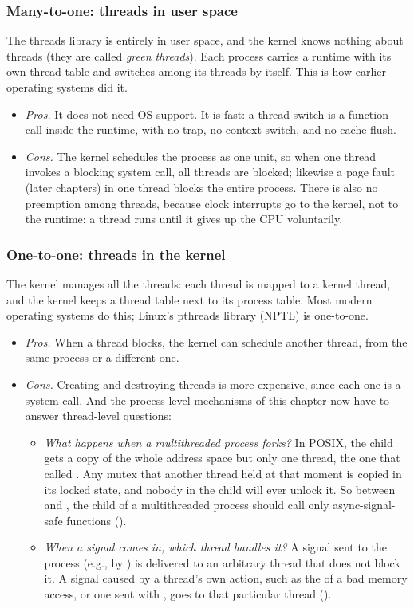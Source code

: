 \subsubsection{Many-to-one: threads in user space}
The threads library is entirely in user space, and the kernel knows nothing about threads (they are called \emph{green threads}). Each process carries a runtime with its own thread table and switches among its threads by itself. This is how earlier operating systems did it.
\begin{itemize}
  \item \emph{Pros.} It does not need OS support. It is fast: a thread switch is a function call inside the runtime, with no trap, no context switch, and no cache flush.
  \item \emph{Cons.} The kernel schedules the process as one unit, so when one thread invokes a blocking system call, all threads are blocked; likewise a page fault (later chapters) in one thread blocks the entire process. There is also no preemption among threads, because clock interrupts go to the kernel, not to the runtime: a thread runs until it gives up the CPU voluntarily.
\end{itemize}

\subsubsection{One-to-one: threads in the kernel}
The kernel manages all the threads: each thread is mapped to a kernel thread, and the kernel keeps a thread table next to its process table. Most modern operating systems do this; Linux's pthreads library (NPTL) is one-to-one.
\begin{itemize}
  \item \emph{Pros.} When a thread blocks, the kernel can schedule another thread, from the same process or a different one.
  \item \emph{Cons.} Creating and destroying threads is more expensive, since each one is a system call. And the process-level mechanisms of this chapter now have to answer thread-level questions:
  \begin{itemize}
    \item \emph{What happens when a multithreaded process forks?} In POSIX, the child gets a copy of the whole address space but only one thread, the one that called . Any mutex that another thread held at that moment is copied in its locked state, and nobody in the child will ever unlock it. So between  and , the child of a multithreaded process should call only async-signal-safe functions ().
    \item \emph{When a signal comes in, which thread handles it?} A signal sent to the process (e.g., by ) is delivered to an arbitrary thread that does not block it. A signal caused by a thread's own action, such as the  of a bad memory access, or one sent with , goes to that particular thread ().
  \end{itemize}
\end{itemize}

